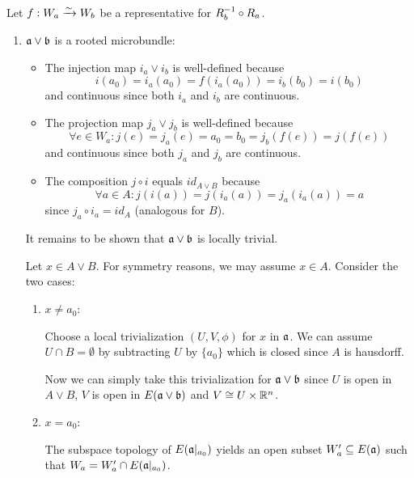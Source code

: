 \begin{myproof}
    Let $f: W_a \xrightarrow{\sim} W_b$ be a representative for $R_b^{-1} \circ R_a$.
    \begin{enumerate}
        \item $\mathfrak{a} \vee \mathfrak{b}$ is a rooted microbundle:
        \begin{itemize}
            \item The injection map $i_a \vee i_b$ is well-defined because 
            \[ i(a_0) = i_a(a_0) = f(i_a(a_0)) = i_b(b_0) = i(b_0) \]
            and continuous since both $i_a$ and $i_b$ are continuous.
            \item The projection map $j_a \vee j_b$ is well-defined because
            \[ \forall e \in W_a: j(e) = j_a(e) = a_0 = b_0 = j_b(f(e)) = j(f(e)) \]
            and continuous since both $j_a$ and $j_b$ are continuous.
            \item The composition $j \circ i$ equals $id_{A \vee B}$ because
            \[ \forall a \in A: j(i(a)) = j(i_a(a)) = j_a(i_a(a)) = a \]
            since $j_a \circ i_a = id_A$ (analogous for $B$).
        \end{itemize}
        It remains to be shown that $\mathfrak{a} \vee \mathfrak{b}$ is locally trivial.

        Let $x \in A \vee B$.
        For symmetry reasons, we may assume $x \in A$.
        Consider the two cases:
        \begin{enumerate}
            \item $x \neq a_0$:
            
            Choose a local trivialization $(U, V, \phi)$ for $x$ in $\mathfrak{a}$.
            We can assume $U \cap B = \emptyset$ by subtracting $U$ by $\{a_0\}$ which is closed since $A$ is hausdorff.
            
            Now we can simply take this trivialization for $\mathfrak{a} \vee \mathfrak{b}$
            since $U$ is open in $A \vee B$, $V$ is open in $E(\mathfrak{a} \vee \mathfrak{b})$ and $V \cong U \times \mathbb{R}^n$.
            \item $x = a_0$:
            
            The subspace topology of $E(\mathfrak{a}\vert_{a_0})$ yields an open subset
            $W_a' \subseteq{} E(\mathfrak{a})$ such that $W_a = W_a' \cap E(\mathfrak{a}\vert_{a_0})$.
    

\end{enumerate}
\end{enumerate}
\end{myproof}
